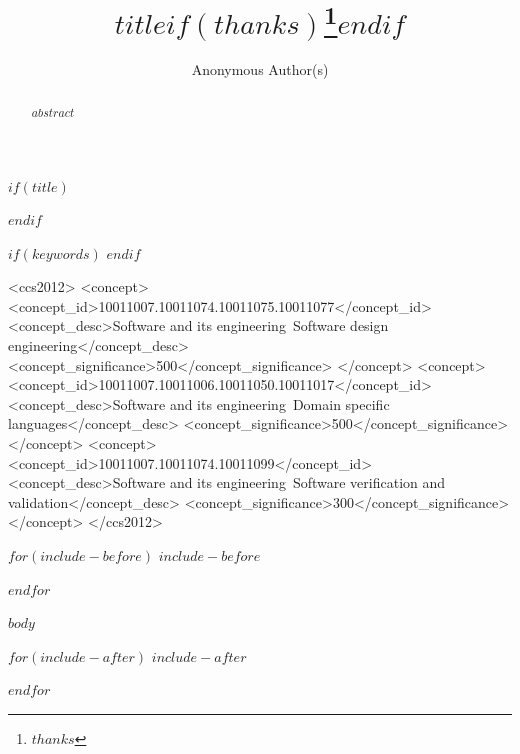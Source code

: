 \documentclass[sigconf,screen,review,anonymous]{acmart}
\title{$title$$if(thanks)$\thanks{$thanks$}$endif$}
\author{Anonymous Author(s)}
\affiliation{
  \institution{Anonymous Institution}
  \country{Anonymous Country}
}
\begin{document}
$if(title)$
\begin{abstract}
$abstract$
\end{abstract}
$endif$

$if(keywords)$
$endif$

\begin{CCSXML}
<ccs2012>
   <concept>
       <concept_id>10011007.10011074.10011075.10011077</concept_id>
       <concept_desc>Software and its engineering~Software design engineering</concept_desc>
       <concept_significance>500</concept_significance>
       </concept>
   <concept>
       <concept_id>10011007.10011006.10011050.10011017</concept_id>
       <concept_desc>Software and its engineering~Domain specific languages</concept_desc>
       <concept_significance>500</concept_significance>
       </concept>
   <concept>
       <concept_id>10011007.10011074.10011099</concept_id>
       <concept_desc>Software and its engineering~Software verification and validation</concept_desc>
       <concept_significance>300</concept_significance>
       </concept>
</ccs2012>
\end{CCSXML}


\maketitle

$for(include-before)$
$include-before$

$endfor$

$body$

$for(include-after)$
$include-after$

$endfor$
\end{document}
